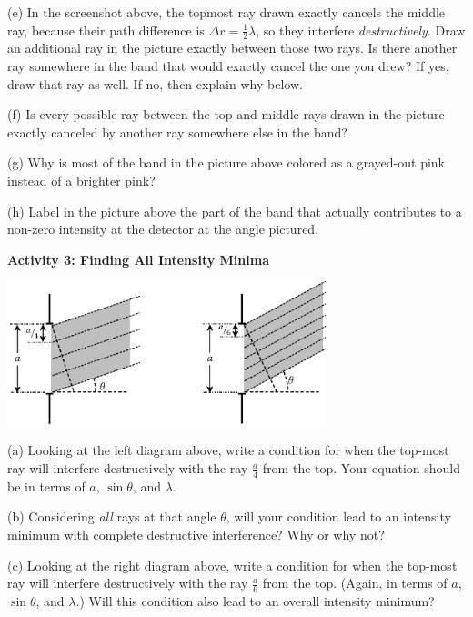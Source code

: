 (e) In the screenshot above, the topmost ray drawn exactly cancels the middle ray, because their path difference is $\Delta r = \frac{1}{2} \lambda$, so they interfere \textit{destructively}.  Draw an additional ray in the picture exactly between those two rays.  Is there another ray somewhere in the band that would exactly cancel the one you drew?  If yes, draw that ray as well.  If no, then explain why below.
\answerspace{0.5in}

(f) Is every possible ray between the top and middle rays drawn in the picture exactly canceled by another ray somewhere else in the band?
\answerspace{0.4in}

(g) Why is most of the band in the picture above colored as a grayed-out pink instead of a brighter pink?
\answerspace{0.4in}

(h) Label in the picture above the part of the band that actually contributes to a non-zero intensity at the detector at the angle pictured.

\pagebreak[3]
\textbf{Activity 3: Finding All Intensity Minima}


\vspace{-0.2in}
\begin{center}
\includegraphics[width=0.7\textwidth]{diffraction_of_light/fourths_and_sixths.eps}
\end{center}
\vspace{-0.2in}

(a) Looking at the left diagram above, write a condition for when the top-most ray will interfere destructively with the ray $\frac{a}{4}$ from the top.  Your equation should be in terms of $a$, $\sin \theta$, and $\lambda$.  
\answerspace{0.4in}

(b) Considering \textit{all} rays at that angle $\theta$, will your condition lead to an intensity minimum with complete destructive interference?  Why or why not?
\answerspace{0.4in}

(c) Looking at the right diagram above, write a condition for when the top-most ray will interfere destructively with the ray $\frac{a}{6}$ from the top.  (Again, in terms of $a$, $\sin \theta$, and $\lambda$.)  Will this condition also lead to an overall intensity minimum?
\answerspace{0.4in}

